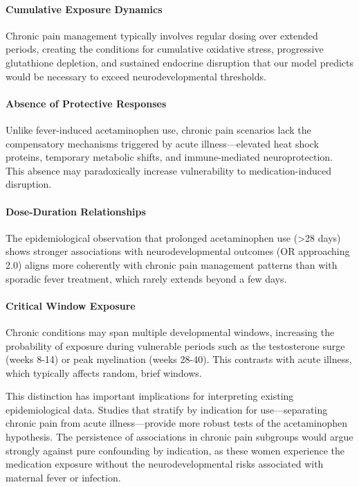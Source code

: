 \documentclass[11pt]{article}
\begin{document}
\paragraph{Cumulative Exposure Dynamics} Chronic pain management typically involves regular dosing over extended periods, creating the conditions for cumulative oxidative stress, progressive glutathione depletion, and sustained endocrine disruption that our model predicts would be necessary to exceed neurodevelopmental thresholds.

\paragraph{Absence of Protective Responses} Unlike fever-induced acetaminophen use, chronic pain scenarios lack the compensatory mechanisms triggered by acute illness---elevated heat shock proteins, temporary metabolic shifts, and immune-mediated neuroprotection. This absence may paradoxically increase vulnerability to medication-induced disruption.

\paragraph{Dose-Duration Relationships} The epidemiological observation that prolonged acetaminophen use (>28 days) shows stronger associations with neurodevelopmental outcomes (OR approaching 2.0) aligns more coherently with chronic pain management patterns than with sporadic fever treatment, which rarely extends beyond a few days.

\paragraph{Critical Window Exposure} Chronic conditions may span multiple developmental windows, increasing the probability of exposure during vulnerable periods such as the testosterone surge (weeks 8-14) or peak myelination (weeks 28-40). This contrasts with acute illness, which typically affects random, brief windows.

This distinction has important implications for interpreting existing epidemiological data. Studies that stratify by indication for use---separating chronic pain from acute illness---provide more robust tests of the acetaminophen hypothesis. The persistence of associations in chronic pain subgroups would argue strongly against pure confounding by indication, as these women experience the medication exposure without the neurodevelopmental risks associated with maternal fever or infection.
\end{document}
